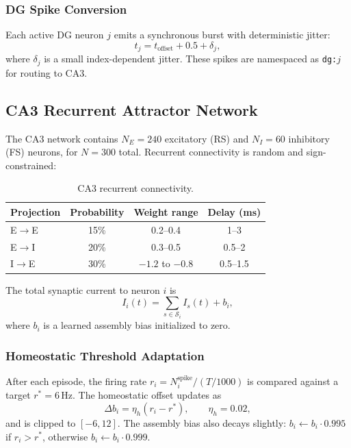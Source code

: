 \subsubsection{DG Spike Conversion}

Each active DG neuron $j$ emits a synchronous burst with deterministic jitter:
\begin{equation}
t_j = t_{\mathrm{offset}} + 0.5 + \delta_j,
\end{equation}
where $\delta_j$ is a small index-dependent jitter. These spikes are namespaced as \texttt{dg:$j$} for routing to CA3.


\subsection{CA3 Recurrent Attractor Network}
\label{sec:ca3}

The CA3 network contains $N_E = 240$ excitatory (RS) and $N_I = 60$ inhibitory (FS) neurons, for $N = 300$ total. Recurrent connectivity is random and sign-constrained:

\begin{table}[h]
\centering
\caption{CA3 recurrent connectivity.}
\begin{tabular}{@{}lccc@{}}
\toprule
\textbf{Projection} & \textbf{Probability} & \textbf{Weight range} & \textbf{Delay (ms)} \\
\midrule
E$\rightarrow$E & 15\% & 0.2--0.4 & 1--3 \\
E$\rightarrow$I & 20\% & 0.3--0.5 & 0.5--2 \\
I$\rightarrow$E & 30\% & $-1.2$ to $-0.8$ & 0.5--1.5 \\
\bottomrule
\end{tabular}
\end{table}

The total synaptic current to neuron $i$ is
\begin{equation}
I_i(t) = \sum_{s \in \mathcal{S}_i} I_s(t) + b_i,
\end{equation}
where $b_i$ is a learned assembly bias initialized to zero.

\subsubsection{Homeostatic Threshold Adaptation}

After each episode, the firing rate $r_i = N_i^{\mathrm{spike}} / (T/1000)$ is compared against a target $r^* = 6$\,Hz. The homeostatic offset updates as
\begin{equation}
\Delta b_i = \eta_h (r_i - r^*), \qquad \eta_h = 0.02,
\end{equation}
and is clipped to $[-6, 12]$. The assembly bias also decays slightly: $b_i \leftarrow b_i \cdot 0.995$ if $r_i > r^*$, otherwise $b_i \leftarrow b_i \cdot 0.999$.

